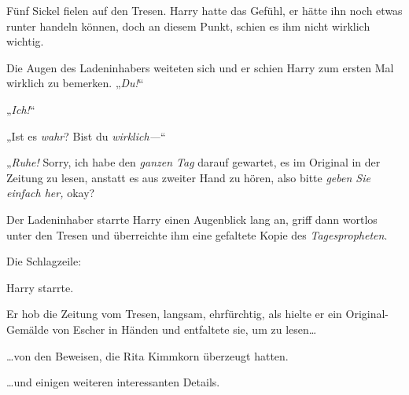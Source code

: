 Fünf Sickel fielen auf den Tresen. Harry hatte das Gefühl, er hätte ihn noch etwas runter handeln können, doch an diesem Punkt, schien es ihm nicht wirklich wichtig.

Die Augen des Ladeninhabers weiteten sich und er schien Harry zum ersten Mal wirklich zu bemerken. „\emph{Du!}“

„\emph{Ich!}“

„Ist es \emph{wahr}? Bist du \emph{wirklich—}“

„\emph{Ruhe!} Sorry, ich habe den \emph{ganzen Tag} darauf gewartet, es im Original in der Zeitung zu lesen, anstatt es aus zweiter Hand zu hören, also bitte \emph{geben Sie einfach her,} okay?

Der Ladeninhaber starrte Harry einen Augenblick lang an, griff dann wortlos unter den Tresen und überreichte ihm eine gefaltete Kopie des \emph{Tagespropheten}.

Die Schlagzeile:


Harry starrte.

Er hob die Zeitung vom Tresen, langsam, ehrfürchtig, als hielte er ein Original-Gemälde von Escher in Händen und entfaltete sie, um zu lesen…

…von den Beweisen, die Rita Kimmkorn überzeugt hatten.

…und einigen weiteren interessanten Details.


